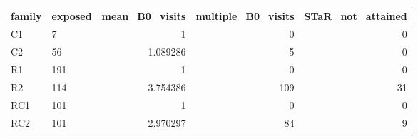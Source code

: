 \begin{tabular}{llrrr}
\hline
family & exposed & mean\_B0\_visits & multiple\_B0\_visits & STaR\_not\_attained \\
\hline
C1 & 7 & 1 & 0 & 0 \\
C2 & 56 & 1.089286 & 5 & 0 \\
R1 & 191 & 1 & 0 & 0 \\
R2 & 114 & 3.754386 & 109 & 31 \\
RC1 & 101 & 1 & 0 & 0 \\
RC2 & 101 & 2.970297 & 84 & 9 \\
\hline
\end{tabular}
